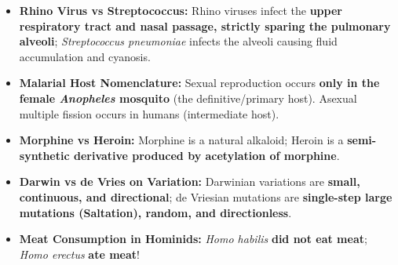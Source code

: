 \documentclass[10pt,a4paper]{article}
\begin{document}
\begin{trapbox}
\begin{itemize}[leftmargin=*]
  \item \textbf{Rhino Virus vs Streptococcus:} Rhino viruses infect the \textbf{upper respiratory tract and nasal passage, strictly sparing the pulmonary alveoli}; \textit{Streptococcus pneumoniae} infects the alveoli causing fluid accumulation and cyanosis.
  \item \textbf{Malarial Host Nomenclature:} Sexual reproduction occurs \textbf{only in the female \textit{Anopheles} mosquito} (the definitive/primary host). Asexual multiple fission occurs in humans (intermediate host).
  \item \textbf{Morphine vs Heroin:} Morphine is a natural alkaloid; Heroin is a \textbf{semi-synthetic derivative produced by acetylation of morphine}.
  \item \textbf{Darwin vs de Vries on Variation:} Darwinian variations are \textbf{small, continuous, and directional}; de Vriesian mutations are \textbf{single-step large mutations (Saltation), random, and directionless}.
  \item \textbf{Meat Consumption in Hominids:} \textit{Homo habilis} \textbf{did not eat meat}; \textit{Homo erectus} \textbf{ate meat}!
\end{itemize}
\end{trapbox}
\end{document}
